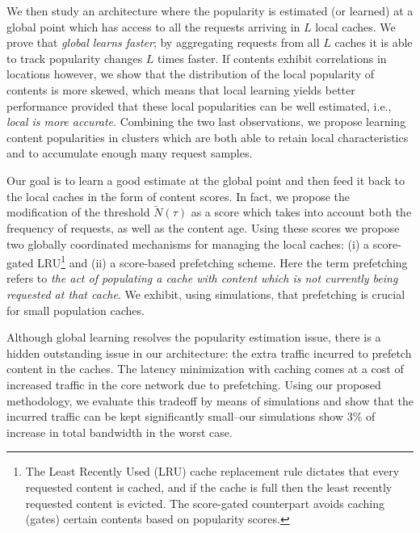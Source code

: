 \documentclass[10pt, conference, letterpaper]{IEEEtran}
\newcommand{\spyros}[1]{{#1}}
\begin{document}
We then study an architecture where the popularity is estimated (or learned) at a global point which has access to all the requests arriving in $L$ local caches. 
We prove that \emph{global learns faster}; by aggregating requests from all $L$ caches it is able to \spyros {track popularity changes} $L$ times faster.
If contents exhibit correlations in locations however, we show that the distribution of the local popularity of contents is more skewed, which means that local learning yields better performance  provided that these local popularities can be well estimated, i.e., \emph{local is more accurate}. \spyros {Combining the two last observations, we propose learning content popularities in clusters which are both able to retain local characteristics and to accumulate enough many request samples.}


Our goal is to learn a good estimate at the global point and then feed it back to the local caches in the form of content scores. In fact, we propose the modification of the threshold $\widetilde N(\tau)$ as a score which  
takes into account both the frequency of requests, as well as the content age. 
Using these scores we propose two globally coordinated mechanisms for \spyros {managing} the local caches: (i) a score-gated LRU\footnote{The Least Recently Used (LRU) cache replacement rule dictates that every requested content is cached, and if the cache is full then the least recently requested content is evicted. The score-gated counterpart avoids caching (gates) certain contents based on popularity scores. } and (ii) a score-based prefetching scheme.  
Here the term prefetching refers to \emph{the act of populating a cache with content which is not currently being requested at that cache}. 
We exhibit, using simulations, that prefetching is crucial for small population caches. 

Although global learning resolves the popularity estimation issue, there is a hidden outstanding issue in our architecture: the extra traffic incurred to prefetch content in the caches.
The latency minimization with caching comes at a cost of increased traffic in the core network due to prefetching. Using our proposed methodology, we evaluate this tradeoff by means of simulations and show that the incurred traffic can be kept significantly small--our simulations show 3\% of increase in total bandwidth in the worst case.
\end{document}
